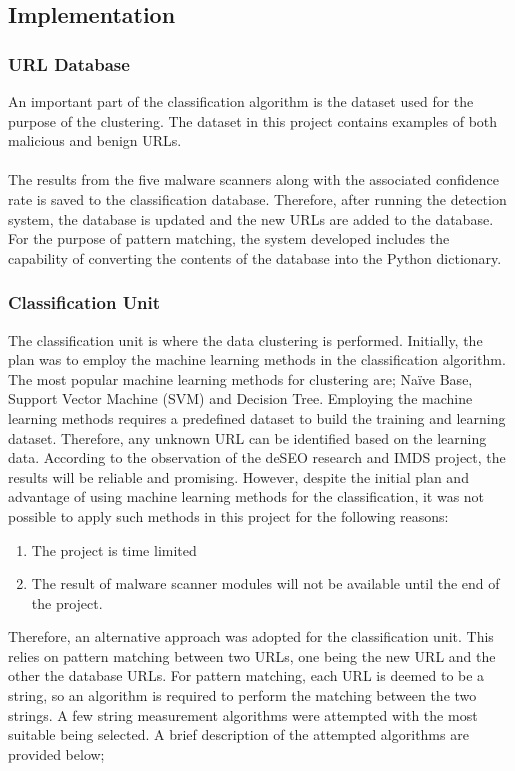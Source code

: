 
\subsection{Implementation}

\subsubsection{URL Database}

An important part of the classification algorithm is the dataset used for the purpose of the clustering. The dataset in this project contains examples of both malicious and benign URLs. 

\paragraph{} 
The results from the five malware scanners along with the associated confidence rate is saved to the classification database. Therefore, after running the detection system, the database is updated and the new URLs are added to the database. For the purpose of pattern matching, the system developed includes the capability of converting the contents of the database into the Python dictionary.

\subsubsection{Classification Unit}
 
The classification unit is where the data clustering is performed. Initially, the plan was to employ the machine learning methods in the classification algorithm. The most popular machine learning methods for clustering are; Naïve Base, Support Vector Machine (SVM) and Decision Tree. Employing the machine learning methods requires a predefined dataset to build the training and learning dataset. Therefore, any unknown URL can be identified based on the learning data. According to the observation of the deSEO research and IMDS project, the results will be reliable and promising\cite{deseo}.
However, despite the initial plan and advantage of using machine learning methods for the classification, it was not possible to apply such methods in this project for the following reasons:
\begin{enumerate} 
\item The project is time limited 
\item The result of malware scanner modules will not be available until the end of the project.
\end{enumerate}
Therefore, an alternative approach was adopted for the classification unit. This relies on pattern matching between two URLs, one being the new URL and the other the database URLs. For pattern matching, each URL is deemed to be a string, so an algorithm is required to perform the matching between the two strings. A few string measurement algorithms were attempted with the most suitable being selected. A brief description of the attempted algorithms are provided below;

